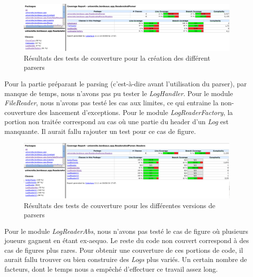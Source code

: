\begin{figure}[!h]
  \begin{center}
\includegraphics[width=\textwidth,height=\textheight,keepaspectratio]{./coverage_ReadersAndParser}
\end{center}
  \caption{Résultats des tests de couverture pour la création des différent parsers}
\end{figure}

Pour la partie préparant le parsing (c'est-à-dire avant l'utilisation du parser), par manque de temps, nous n'avons pas pu tester le \textit{LogHandler}. Pour le module \textit{FileReader}, nous n'avons pas testé les cas aux limites, ce qui entraine la non-couverture des lancement d'exceptions. Pour le module \textit{LogReaderFactory}, la portion non traitée correspond au cas où une partie du header d'un \textit{Log} est manquante. Il aurait fallu rajouter un test pour ce cas de figure.

\begin{figure}[!h]
  \begin{center}
    \includegraphics[width=\textwidth,height=\textheight,keepaspectratio]{./coverage_ReadersLog}
  \end{center}
  \caption{Résultats des tests de couverture pour les différentes versions de parsers}
\end{figure}

Pour le module \textit{LogReaderAbs}, nous n'avons pas testé le cas de figure où plusieurs joueurs gagnent en étant ex-aequo. Le reste du code non couvert correspond à des cas de figures plus rares. Pour obtenir une couverture de ces portions de code, il aurait fallu trouver ou bien construire des \textit{Logs} plus variés. Un certain nombre de facteurs, dont le temps nous a empêché d'effectuer ce travail assez long.

